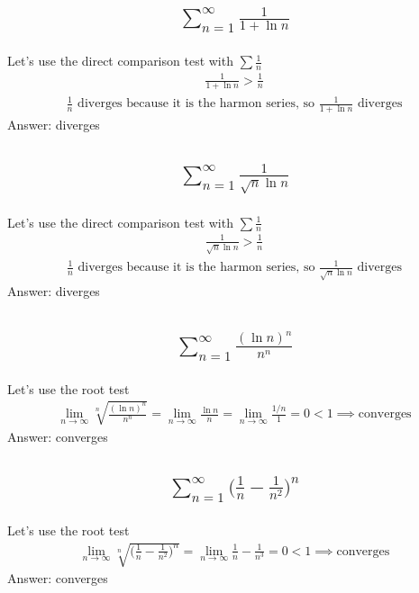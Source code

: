 \documentclass{article}
\begin{document}
\subsection{
	\begin{align*}
		\sum_{n = 1}^{\infty} \frac{1}{1 +\ln{n}}
	\end{align*}
}
Let's use the direct comparison test with $\sum \frac{1}{n}$
\begin{align*}
	\frac{1}{1 + \ln{n}} > \frac{1}{n}
\end{align*}
\begin{align*}
	\frac{1}{n} \text{ diverges because it is the harmon series, so } \frac{1}{1 + \ln{n}} \text{ diverges}
\end{align*}
Answer: diverges

\subsection{
	\begin{align*}
		\sum_{n = 1}^{\infty} \frac{1}{\sqrt{n} \ln{n}}
	\end{align*}
}
Let's use the direct comparison test with $\sum \frac{1}{n}$
\begin{align*}
	\frac{1}{\sqrt{n} \ln{n}} > \frac{1}{n}
\end{align*}
\begin{align*}
	\frac{1}{n} \text{ diverges because it is the harmon series, so } \frac{1}{\sqrt{n} \ln{n}} \text{ diverges}
\end{align*}
Answer: diverges

\subsection{
	\begin{align*}
		\sum_{n = 1}^{\infty} \frac{(\ln{n})^n}{n^n}
	\end{align*}
}
Let's use the root test
\begin{align*}
	\lim_{n \to \infty} {\sqrt[n]{\frac{(\ln{n})^n}{n^n}}} = \lim_{n \to \infty} \frac{\ln{n}}{n} = \lim_{n \to \infty} {\frac{1/n}{1}} = 0 < 1 \implies \text{converges}
\end{align*}
Answer: converges

\subsection{
	\begin{align*}
		\sum_{n = 1}^{\infty} \bigg( \frac{1}{n} - \frac{1}{n^2} \bigg)^n
\end{align*}
}
Let's use the root test
\begin{align*}
	\lim_{n \to \infty} {\sqrt[n]{\bigg( \frac{1}{n} - \frac{1}{n^2} \bigg)^n}} = \lim_{n \to \infty} {\frac{1}{n} - \frac{1}{n^3}} = 0 < 1 \implies \text{converges}
\end{align*}
Answer: converges
\end{document}
